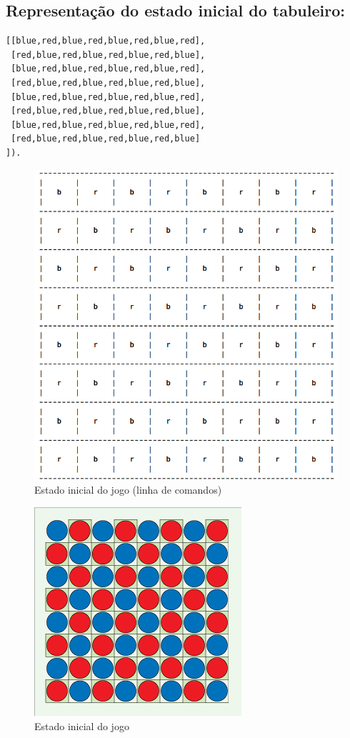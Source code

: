 \documentclass[a4paper,11pt,titlepage]{article}
\begin{document}
\subsection{Representação do estado inicial do tabuleiro:}
\begin{verbatim}
[[blue,red,blue,red,blue,red,blue,red],
 [red,blue,red,blue,red,blue,red,blue],
 [blue,red,blue,red,blue,red,blue,red],
 [red,blue,red,blue,red,blue,red,blue],
 [blue,red,blue,red,blue,red,blue,red],
 [red,blue,red,blue,red,blue,red,blue],
 [blue,red,blue,red,blue,red,blue,red],
 [red,blue,red,blue,red,blue,red,blue]
]).
\end{verbatim}

\begin{figure}[H]
    \center
    \includegraphics[scale=0.35]{res/initial-state-cli.png}
    \caption{Estado inicial do jogo (linha de comandos)}
    \label{fig:initial-state-cli.jpg}
\end{figure}

\begin{figure}[H]
    \center
    \includegraphics[scale=0.8]{res/initial-state.jpg}
    \caption{Estado inicial do jogo}
    \label{fig:initial-state.png}
\end{figure}
\end{document}
